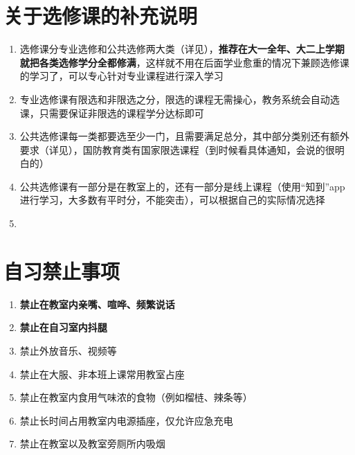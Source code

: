 \section[关于选修课的补充说明]{关于选修课的补充说明}
\begin{enumerate}
    \item 选修课分专业选修和公共选修两大类（详见），\textbf{推荐在大一全年、大二上学期就把各类选修学分全都修满}，这样就不用在后面学业愈重的情况下兼顾选修课的学习了，可以专心针对专业课程进行深入学习
    \item 专业选修课有限选和非限选之分，限选的课程无需操心，教务系统会自动选课，只需要保证非限选的课程学分达标即可
    \item 公共选修课每一类都要选至少一门，且需要满足总分，其中部分类别还有额外要求（详见），国防教育类有国家限选课程（到时候看具体通知，会说的很明白的）
    \item 公共选修课有一部分是在教室上的，还有一部分是线上课程（使用“知到”app进行学习，大多数有平时分，不能突击），可以根据自己的实际情况选择\footnotemark
    \item \textbf{}
\end{enumerate}

\section[自习禁止事项]{自习禁止事项}
\begin{enumerate}
    \item \textbf{禁止在教室内亲嘴、喧哗、频繁说话}
    \item \textbf{禁止在自习室内抖腿}
    \item 禁止外放音乐、视频等
    \item 禁止在大服、非本班上课常用教室占座
    \item 禁止在教室内食用气味浓的食物（例如榴梿、辣条等）
    \item 禁止长时间占用教室内电源插座，仅允许应急充电
    \item 禁止在教室以及教室旁厕所内吸烟
\end{enumerate}

